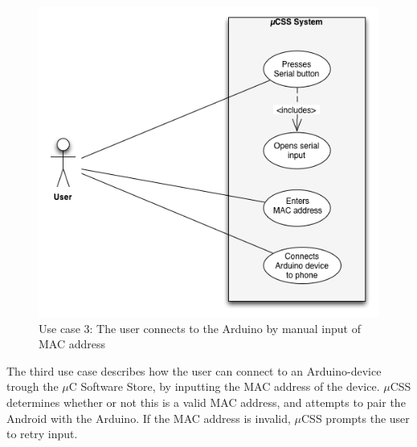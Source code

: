 \begin{figure}[H]
\centering
\includegraphics[scale=0.7]{images/UseCase3}
\caption[Use case 3]{Use case 3: The user connects to the Arduino by manual input of MAC address}
\end{figure}

The third use case describes how the user can connect to an Arduino-device trough the $\mu$C Software Store, by inputting the MAC address of the device. $\mu$CSS determines whether or not this is a valid MAC address, and attempts to pair the Android with the Arduino. If the MAC address is invalid, $\mu$CSS prompts the user to retry input.

